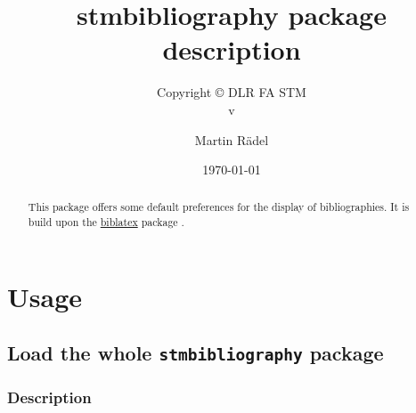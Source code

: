 
\usepackage[T1]{fontenc}
\usepackage[utf8]{inputenc}
\usepackage{enumitem}

\usepackage[%
  style=stmdefault,%
]{stmbibliography}




\author{Martin R\"{a}del}
\title{stmbibliography package description}
\subtitle{Copyright \copyright{} \the\year{} DLR FA STM\\v\formatdate[versiondatestyle]{\DTMToday}}
\date{\today}




\maketitle

\begin{abstract}
This package offers some default preferences for the display of bibliographies. It is build upon the \href{https://ctan.org/pkg/biblatex}{biblatex} package \cite{biblatex314_20191201}.
\end{abstract}

\tableofcontents

\conditionallistoffigures  %
\conditionallistoftables   %
\conditionallistoflistings %

\section{Usage}%

\subsection{Load the whole \protect\texttt{stmbibliography} package}
\label{sec:usage:preamble:wholepackage}

\subsubsection{Description}
\label{sec:usage:preamble:wholepackage:description}

